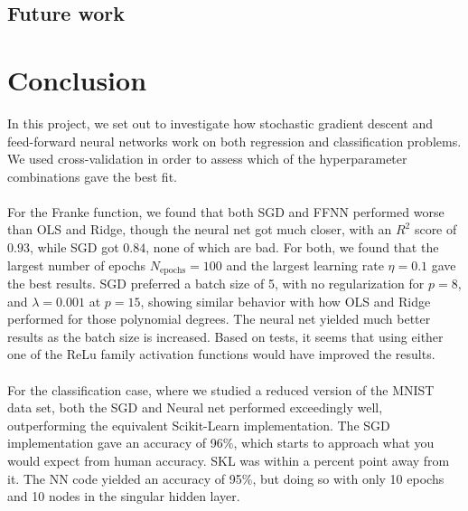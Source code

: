 \documentclass[a4paper]{article}
\newcommand{\Nepochs}{N_{\text{epochs}}}
\begin{document}
\subsection{Future work} \label{sec:future}

\section{Conclusion} \label{chap:conclusion}
In this project, we set out to investigate how stochastic gradient descent and feed-forward neural networks work on both regression and classification problems. We used cross-validation in order to assess which of the hyperparameter combinations gave the best fit.
\\\\
For the Franke function, we found that both SGD and FFNN performed worse than OLS and Ridge, though the neural net got much closer, with an $R^2$ score of $0.93$, while SGD got $0.84$, none of which are bad. For both, we found that the largest number of epochs $\Nepochs = 100$ and the largest learning rate $\eta=0.1$ gave the best results. SGD preferred a batch size of 5, with no regularization for $p=8$, and $\lambda=0.001$ at $p=15$, showing similar behavior with how OLS and Ridge performed for those polynomial degrees. The neural net yielded much better results as the batch size is increased. Based on tests, it seems that using either one of the ReLu family activation functions would have improved the results.
\\\\
For the classification case, where we studied a reduced version of the MNIST data set, both the SGD and Neural net performed exceedingly well, outperforming the equivalent Scikit-Learn implementation. The SGD implementation gave an accuracy of 96\%, which starts to approach what you would expect from human accuracy. SKL was within a percent point away from it. The NN code yielded an accuracy of 95\%, but doing so with only 10 epochs and 10 nodes in the singular hidden layer. 

\end{document}
